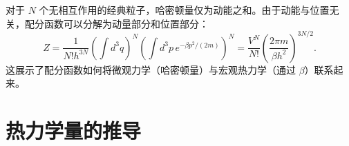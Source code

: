 \begin{example}[经典理想气体的配分函数]
对于 $N$ 个无相互作用的经典粒子，哈密顿量仅为动能之和。由于动能与位置无关，配分函数可以分解为动量部分和位置部分：
\begin{equation}
    Z = \frac{1}{N! h^{3N}} \left(\int d^3q \right)^N \left(\int d^3p \, e^{-\beta p^2/(2m)}\right)^N = \frac{V^N}{N!} \left(\frac{2\pi m}{\beta h^2}\right)^{3N/2}.
\end{equation}
这展示了配分函数如何将微观力学（哈密顿量）与宏观热力学（通过 $\beta$）联系起来。
\end{example}

\section{热力学量的推导}

